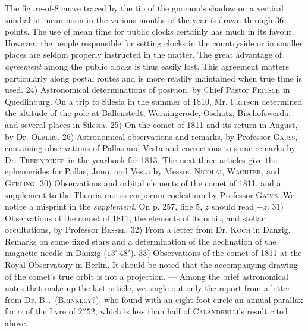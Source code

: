 The figure-of-8 curve traced by the tip of the gnomon's shadow on a vertical sundial at mean noon in the various months of the year is drawn through 36 points. The use of mean time for public clocks certainly has much in its favour. However, the people responsible for setting clocks in the countryside or in smaller places are seldom properly instructed in the matter. The great advantage of \emph{agreement} among the public clocks is thus easily lost. This agreement matters particularly along postal routes and is more readily maintained when true time is used. 24) Astronomical determinations of position, by Chief Pastor \textsc{Fritsch} in Quedlinburg. On a trip to Silesia in the summer of 1810, Mr. \textsc{Fritsch} determined the altitude of the pole at Ballenstedt, Werningerode, Oschatz, Bischofswerda, and several places in Silesia. 25) On the comet of 1811 and its return in August, by Dr. \textsc{Olbers}. 26) Astronomical observations and remarks, by Professor \textsc{Gauss}, containing observations of Pallas and Vesta and corrections to some remarks by Dr. \textsc{Treisnecker} in the yearbook for 1813. The next three articles give the ephemerides for Pallas, Juno, and Vesta by Messrs. \textsc{Nicolai}, \textsc{Wachter}, and \textsc{Gerling}. 30) Observations and orbital elements of the comet of 1811, and a supplement to the Theoria motus corporum coelestium by Professor \textsc{Gauss}. We notice a misprint in the \emph{supplement}. On p. 257, line 5, $z$ should read $-z$. 31) Observations of the comet of 1811, the elements of its orbit, and stellar occultations, by Professor \textsc{Bessel}. 32) From a letter from Dr. \textsc{Koch} in Danzig. Remarks on some fixed stars and a determination of the declination of the magnetic needle in Danzig ($13^\circ\,48'$). 33) Observations of the comet of 1811 at the Royal Observatory in Berlin. It should be noted that the accompanying drawing of the comet's true orbit is not a projection. --- Among the brief astronomical notes that make up the last article, we single out only the report from a letter from Dr. B\dots\ (\textsc{Brinkley}?), who found with an eight-foot circle an annual parallax for $\alpha$ of the Lyre of $2''52$, which is less than half of \textsc{Calandrelli}'s result cited above.

